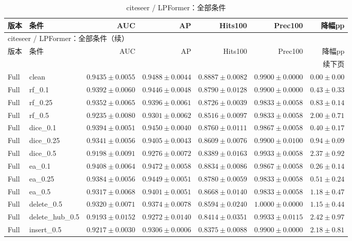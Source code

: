 \documentclass[UTF8,a4paper,11pt,fontset=fandol]{ctexart}
\begin{document}
{\footnotesize
\setlength{\tabcolsep}{3pt}
\begin{longtable}{llrrrrr}
\caption{citeseer / LPFormer：全部条件}\\
\toprule
版本 & 条件 & AUC & AP & Hits100 & Prec100 & 降幅pp \\
\midrule
\endfirsthead
\multicolumn{7}{l}{citeseer / LPFormer：全部条件（续）}\\
\toprule
版本 & 条件 & AUC & AP & Hits100 & Prec100 & 降幅pp \\
\midrule
\endhead
\midrule\multicolumn{7}{r}{续下页}\\
\endfoot
\bottomrule\endlastfoot
Full & clean & $0.9435\pm0.0055$ & $0.9488\pm0.0044$ & $0.8887\pm0.0082$ & $0.9900\pm0.0000$ & $0.00\pm0.00$ \\
Full & rf\_0.1 & $0.9392\pm0.0060$ & $0.9446\pm0.0048$ & $0.8790\pm0.0128$ & $0.9900\pm0.0000$ & $0.43\pm0.33$ \\
Full & rf\_0.25 & $0.9352\pm0.0065$ & $0.9396\pm0.0061$ & $0.8726\pm0.0039$ & $0.9833\pm0.0058$ & $0.83\pm0.14$ \\
Full & rf\_0.5 & $0.9235\pm0.0080$ & $0.9301\pm0.0062$ & $0.8516\pm0.0097$ & $0.9833\pm0.0058$ & $2.00\pm0.71$ \\
Full & dice\_0.1 & $0.9394\pm0.0051$ & $0.9450\pm0.0040$ & $0.8760\pm0.0111$ & $0.9867\pm0.0058$ & $0.40\pm0.17$ \\
Full & dice\_0.25 & $0.9341\pm0.0056$ & $0.9405\pm0.0043$ & $0.8609\pm0.0076$ & $0.9900\pm0.0100$ & $0.94\pm0.09$ \\
Full & dice\_0.5 & $0.9198\pm0.0091$ & $0.9276\pm0.0072$ & $0.8389\pm0.0163$ & $0.9933\pm0.0058$ & $2.37\pm0.92$ \\
Full & ea\_0.1 & $0.9408\pm0.0064$ & $0.9472\pm0.0058$ & $0.8834\pm0.0086$ & $0.9867\pm0.0058$ & $0.26\pm0.14$ \\
Full & ea\_0.25 & $0.9384\pm0.0056$ & $0.9449\pm0.0051$ & $0.8780\pm0.0059$ & $0.9833\pm0.0058$ & $0.51\pm0.24$ \\
Full & ea\_0.5 & $0.9317\pm0.0068$ & $0.9401\pm0.0051$ & $0.8668\pm0.0140$ & $0.9833\pm0.0058$ & $1.18\pm0.47$ \\
Full & delete\_0.5 & $0.9320\pm0.0071$ & $0.9374\pm0.0078$ & $0.8594\pm0.0240$ & $1.0000\pm0.0000$ & $1.15\pm0.44$ \\
Full & delete\_hub\_0.5 & $0.9193\pm0.0152$ & $0.9272\pm0.0140$ & $0.8414\pm0.0351$ & $0.9933\pm0.0115$ & $2.42\pm0.97$ \\
Full & insert\_0.5 & $0.9217\pm0.0030$ & $0.9306\pm0.0006$ & $0.8375\pm0.0088$ & $0.9900\pm0.0000$ & $2.18\pm0.81$ \\

\end{longtable}}
\end{document}
